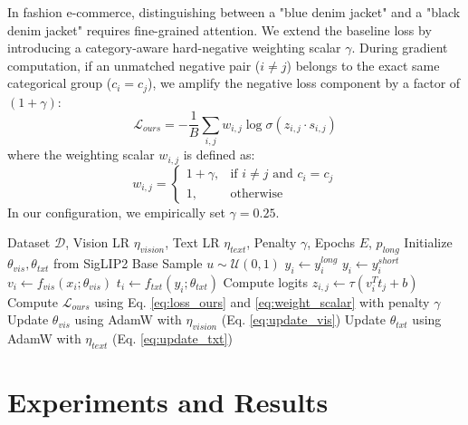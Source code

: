 \documentclass[conference]{IEEEtran}
\begin{document}
In fashion e-commerce, distinguishing between a "blue denim jacket" and a "black denim jacket" requires fine-grained attention. We extend the baseline loss by introducing a category-aware hard-negative weighting scalar $\gamma$. During gradient computation, if an unmatched negative pair ($i \neq j$) belongs to the exact same categorical group ($c_i = c_j$), we amplify the negative loss component by a factor of $(1 + \gamma)$:
\begin{equation}
    \mathcal{L}_{ours} = - \frac{1}{B} \sum_{i,j} w_{i,j} \log \sigma(z_{i,j} \cdot s_{i,j})
    \label{eq:loss_ours}
\end{equation}
where the weighting scalar $w_{i,j}$ is defined as:
\begin{equation}
w_{i,j} = 
\begin{cases} 
1 + \gamma, & \text{if } i \neq j \text{ and } c_i = c_j \\
1, & \text{otherwise}
\end{cases}
\label{eq:weight_scalar}
\end{equation}
In our configuration, we empirically set $\gamma = 0.25$. 

\begin{algorithm}[htbp]
\caption{FashionVLM Training Loop}
\begin{algorithmic}[1]
\REQUIRE Dataset $\mathcal{D}$, Vision LR $\eta_{vision}$, Text LR $\eta_{text}$, Penalty $\gamma$, Epochs $E$, $p_{long}$
\STATE Initialize $\theta_{vis}, \theta_{txt}$ from SigLIP2 Base
        \STATE Sample $u \sim \mathcal{U}(0,1)$
            \STATE $y_i \leftarrow y_i^{long}$
        \ELSE
            \STATE $y_i \leftarrow y_i^{short}$
        \ENDIF
        \STATE $v_i \leftarrow f_{vis}(x_i; \theta_{vis})$
        \STATE $t_i \leftarrow f_{txt}(y_i; \theta_{txt})$
        \STATE Compute logits $z_{i,j} \leftarrow \tau (v_i^T t_j + b)$
        \STATE Compute $\mathcal{L}_{ours}$ using Eq. \ref{eq:loss_ours} and \ref{eq:weight_scalar} with penalty $\gamma$
        \STATE Update $\theta_{vis}$ using AdamW with $\eta_{vision}$ (Eq. \ref{eq:update_vis})
        \STATE Update $\theta_{txt}$ using AdamW with $\eta_{text}$ (Eq. \ref{eq:update_txt})
    \ENDFOR
\ENDFOR
\end{algorithmic}
\end{algorithm}

\section{Experiments and Results}
\end{document}
